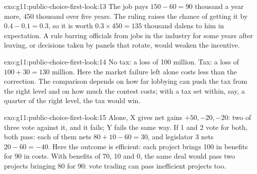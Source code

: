 \begin{solution}{exo:g11:public-choice-first-look:13}
The job pays $150 - 60 = 90$ thousand a year more, 450 thousand over five years. The ruling raises the chance of getting it by $0.4 - 0.1 = 0.3$, so it is worth
$0.3 \times 450 = 135$ thousand dalens to him in expectation. A rule barring officials from jobs in the industry for some years after leaving, or decisions taken by panels
that rotate, would weaken the incentive.
\end{solution}

\begin{solution}{exo:g11:public-choice-first-look:14}
No tax: a loss of 100 million. Tax: a loss of $100 + 30 = 130$ million. Here the market failure left alone costs less than the correction. The comparison depends on how
far lobbying can push the tax from the right level and on how much the contest costs; with a tax set within, say, a quarter of the right level, the tax would win.
\end{solution}

\begin{solution}{exo:g11:public-choice-first-look:15}
Alone, X gives net gains $+50, -20, -20$: two of three vote against it, and it fails; Y fails the same way. If 1 and 2 vote for both, both pass: each of them nets
$80 + 10 - 60 = 30$, and legislator 3 nets $20 - 60 = -40$. Here the outcome is efficient: each project brings 100 in benefits for 90 in costs. With benefits of 70, 10 and
0, the same deal would pass two projects bringing 80 for 90: vote trading can pass inefficient projects too.
\end{solution}

